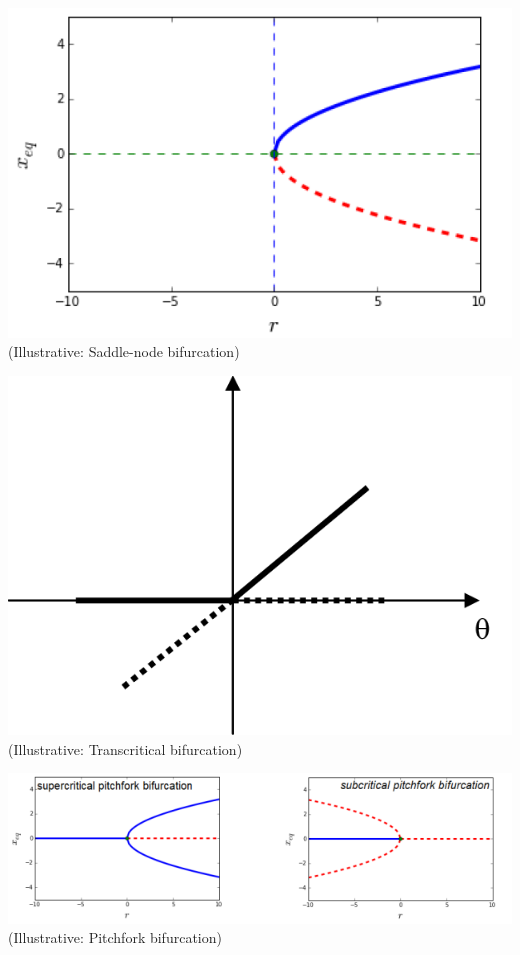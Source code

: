 \documentclass[aspectratio=169]{beamer}
\begin{document}
\begin{frame}
	\centering
	\includegraphics[width=0.8\linewidth]{pics/saddle-node-bif.png}\\
	\tiny (Illustrative: Saddle-node bifurcation)
\end{frame}

\begin{frame}
	\centering
	\includegraphics[width=0.8\linewidth]{pics/transcritical-bif.png}\\
	\tiny (Illustrative: Transcritical bifurcation)
\end{frame}

\begin{frame}
	\centering
	\includegraphics[width=1.01\linewidth]{pics/pitchfork-bif.png}\\
	\tiny (Illustrative: Pitchfork bifurcation)
\end{frame}
\end{document}
